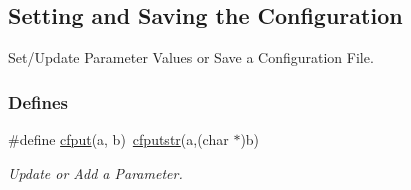 \hypertarget{group__setting__saving}{\subsection{Setting and Saving the Configuration}
\label{group__setting__saving}
}


Set/\-Update Parameter Values or Save a Configuration File.  


\subsubsection*{Defines}
\begin{DoxyCompactItemize}
\item 
\#define \hyperlink{group__setting__saving_gab4370bac1e151641bfb78e65f8ec4b44}{cfput}(a, b)~\hyperlink{group__setting__saving_ga9553f7a24b080660793a560c2bc8f210}{cfputstr}(a,(char $\ast$)b)
\begin{DoxyCompactList}\small\item\em Update or Add a Parameter. \end{DoxyCompactList}\end{DoxyCompactItemize}
